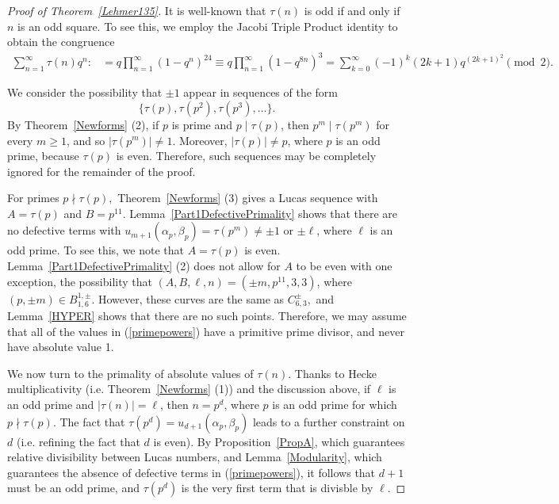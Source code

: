 \documentclass[12pt]{amsart}
\newcommand{\?}{\color{red}?}
\numberwithin{equation}{section}
\begin{document}
\begin{proof}[Proof of Theorem~\ref{Lehmer135}]
It is well-known that $\tau(n)$ is odd if and only if $n$ is an odd square. 
To see this, we employ 
 the Jacobi Triple Product identity to obtain the congruence
\begin{displaymath}
\begin{split}
\sum_{n=1}^{\infty}\tau(n)q^n:&=q\prod_{n=1}^{\infty}(1-q^n)^{24}
\equiv q\prod_{n=1}^{\infty}(1-q^{8n})^3
=\sum_{k=0}^{\infty} (-1)^k(2k+1)q^{(2k+1)^2}\pmod 2.
\end{split}
\end{displaymath}


We consider the possibility that $\pm 1$ appear in sequences of the form
\begin{equation}\label{primepowers}
\{\tau(p),\tau(p^2), \tau(p^3),\dots\}.
\end{equation}
By Theorem~\ref{Newforms} (2), if $p$ is prime and  $p\mid \tau(p)$, then $p^m\mid \tau(p^m)$ for every $m\geq 1$, and
so $|\tau(p^m)|\neq 1.$  Moreover, $|\tau(p)|\neq p$, where $p$ is an odd prime, because $\tau(p)$ is even.
Therefore, such sequences may be completely ignored for the remainder of the proof.

For primes
$p\nmid \tau(p),$ Theorem~\ref{Newforms} (3) gives a Lucas sequence 
with $A=\tau(p)$ and $B=p^{11}.$
Lemma~\ref{Part1DefectivePrimality} shows that there are no defective terms with
$u_{m+1}(\alpha_p,\beta_p)=\tau(p^m)\neq \pm 1$ or $\pm \ell$, where $\ell$ is an odd prime.
To see this, we note that $A=\tau(p)$ is even.  Lemma~\ref{Part1DefectivePrimality} (2) does not allow
for $A$ to be even with one exception, the possibility that  $(A,B,\ell,n )=(\pm m,p^{11}, 3,3)$, where $(p,\pm m)\in B_{1,6}^{1,\pm}.$
However, these curves are the same as $C_{6,3}^{\pm},$ and Lemma~\ref{HYPER}  shows that there are no such points.
Therefore, we may assume that all of 
the values in (\ref{primepowers}) have a primitive prime divisor, and  never have  absolute value 1.

We now turn to the primality of absolute values of $\tau(n)$.
Thanks to Hecke multiplicativity (i.e. Theorem~\ref{Newforms} (1)) and the discussion above, if $\ell$ is an odd prime and $|\tau(n)|=\ell$, then $n=p^d$, where $p$ is an odd prime for which
 $p\nmid \tau(p).$ The fact that $\tau(p^d)=u_{d+1}(\alpha_p,\beta_p)$ leads to a further constraint on $d$ 
(i.e. refining 
 the fact that $d$ is even).
By Proposition~\ref{PropA}, which guarantees relative divisibility between Lucas numbers, and 
 Lemma~\ref{Modularity}, which guarantees the absence of defective terms in (\ref{primepowers}), it follows that 
$d+1$ must be an odd prime, and $\tau(p^d)$ is the very first term that is divisble by $\ell$.
 

\end{proof}
\end{document}
